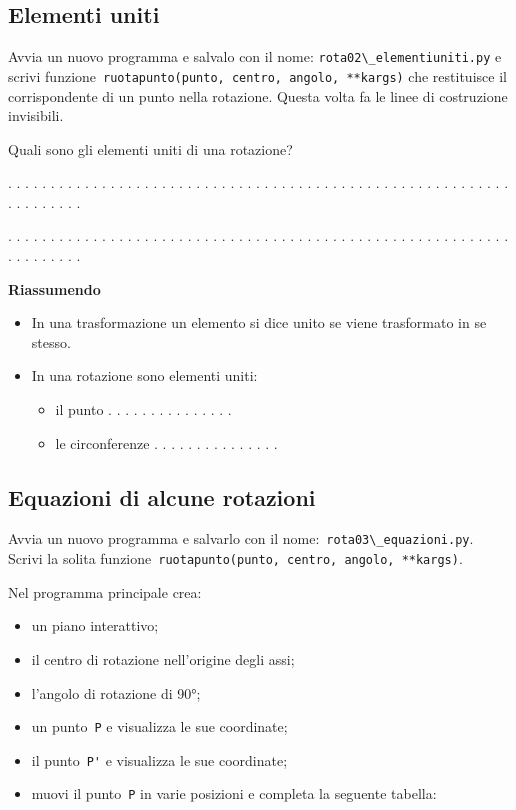 \subsection{Elementi uniti}

Avvia un nuovo programma e salvalo con il nome: 
\lstinline{rota02\_elementiuniti.py}
e scrivi  funzione~\lstinline{ruotapunto(punto, centro, angolo, **kargs)} che
restituisce il corrispondente di un punto nella rotazione.
Questa volta fa le linee di costruzione invisibili.

Quali sono gli elementi uniti di una rotazione?

. . . . . . . . . . . . . . . . . . . . . . . . . . . . . . . . . . . . . . . .
. . . . . . . . . . . . . . . . . . . . . . . . . . . .

. . . . . . . . . . . . . . . . . . . . . . . . . . . . . . . . . . . . . . . .
. . . . . . . . . . . . . . . . . . . . . . . . . . . .

\textbf{Riassumendo}

\begin{itemize} [noitemsep]
\item In una trasformazione un elemento si dice unito se viene trasformato in se
stesso.
\item In una rotazione sono elementi uniti:
\begin{itemize} [noitemsep]
\item il punto . . . . . . . . . . . . . . .
\item le circonferenze . . . . . . . . . . . . . . .
\end{itemize}
\end{itemize}


\subsection{Equazioni di alcune rotazioni}

Avvia un nuovo programma e salvarlo con il 
nome:~\lstinline{rota03\_equazioni.py}.
Scrivi la solita 
funzione~\lstinline{ruotapunto(punto, centro, angolo, **kargs)}.

Nel programma principale crea:
\begin{itemize} [noitemsep]
\item un piano interattivo;
\item il centro di rotazione nell'origine degli assi;
\item l'angolo di rotazione di 90°;
\item un punto~\lstinline{P} e visualizza le sue coordinate;
\item il punto~\lstinline{P'} e visualizza le sue coordinate;
\item muovi il punto~\lstinline{P} in varie posizioni e completa la seguente 
 tabella:

\end{itemize}

